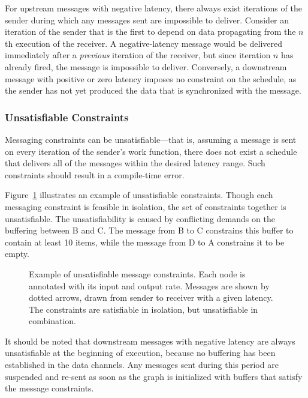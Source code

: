 For upstream messages with negative latency, there always exist
iterations of the sender during which any messages sent are
impossible to deliver.  Consider an iteration of the sender that is
the first to depend on data propagating from the $n$th execution of
the receiver.  A negative-latency message would be delivered
immediately after a {\it previous} iteration of the receiver, but
since iteration $n$ has already fired, the message is impossible to
deliver.  Conversely, a downstream message with positive or zero
latency imposes no constraint on the schedule, as the sender has not
yet produced the data that is synchronized with the message.

\subsubsection*{Unsatisfiable Constraints}  
Messaging constraints can be unsatisfiable---that is, assuming a
message is sent on every iteration of the sender's work function,
there does not exist a schedule that delivers all of the messages
within the desired latency range.  Such constraints should result in a
compile-time error.  

Figure~\ref{fig:infeasible} illustrates an example of unsatisfiable
constraints.  Though each messaging constraint is feasible in
isolation, the set of constraints together is unsatisfiable.  The
unsatisfiability is caused by conflicting demands on the buffering
between B and C.  The message from B to C constrains this buffer to
contain at least 10 items, while the message from D to A constrains it
to be empty.
\begin{figure}[t]
\begin{center}
\vspace{-8pt}
\caption[Example of unsatisfiable message constraints.]{Example of
  unsatisfiable message constraints.  Each node is annotated with its
  input and output rate.  Messages are shown by dotted arrows, drawn
  from sender to receiver with a given latency.  The constraints are
  satisfiable in isolation, but unsatisfiable in combination.
  \protect\label{fig:infeasible}}
\end{center}
\vspace{-13pt}
\end{figure}

It should be noted that downstream messages with negative latency are
always unsatisfiable at the beginning of execution, because no
buffering has been established in the data channels.  Any messages
sent during this period are suspended and re-sent as soon as the graph
is initialized with buffers that satisfy the message constraints.

